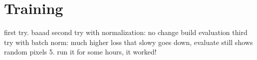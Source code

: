 \section{Training}
first try. baaad
second try with normalization: no change
build evaluation
third try with batch norm: much higher loss that slowy goes down, evaluate still shows random pixels
5. run it for some hours, it worked!


